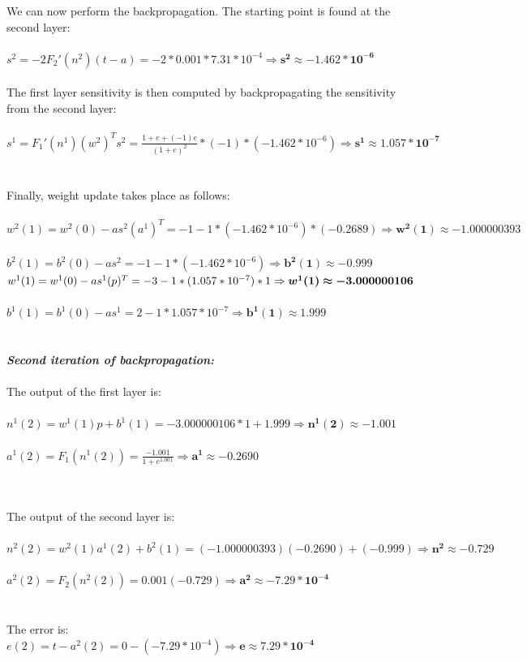\documentclass{article}
\begin{document}
\noindent We can now perform the backpropagation. The starting point is found at the second layer: \\ \\
$s^2 = -2F_2'(n^2)(t-a) = -2 * 0.001 * 7.31 * 10^{-4} \Rightarrow \bm{s^2 \approx -1.462 * 10^{-6}}$
\\\\ The first layer sensitivity is then computed by backpropagating the sensitivity from the second layer: \\ \\ $s^1 = F_1'(n^1)(w^2)^Ts^2 = \frac{1+e+(-1)e}{(1+e)^2} * (-1) *(-1.462 * 10^{-6}) \Rightarrow \bm{s^1 \approx 1.057 * 10^{-7}}$
\\\\ \\Finally, weight update takes place as follows: \\\\
$w^2(1) = w^2(0) - as^2(a^1)^T = -1 -1 * (-1.462 * 10 ^{-6}) * (-0.2689) \Rightarrow \bm{w^2(1) \approx -1.000000393}$
\\ \\ $b^2(1) = b^2(0) -as^2 = -1 -1 * (-1.462 * 10 ^ {-6}) \Rightarrow \bm{b^2(1) \approx -0.999}$
$\\ \\ \\ w^1(1) = w^1(0) -as^1(p)^T = -3 -1 * (1.057 * 10^{-7}) * 1 \Rightarrow \bm{w^1(1) \approx -3.000000106} $ 
\\ \\$b^1(1) = b^1(0) - as^1 = 2 - 1 * 1.057 * 10^{-7} \Rightarrow \bm{b^1(1) \approx 1.999}$\\ \\ \\

\noindent \textbf{\textit{Second iteration of backpropagation:}}
\noindent \\ \\The output of the first layer is: \\ \\$n^1(2) = w^1(1)p + b^1(1) = -3.000000106 * 1 + 1.999\Rightarrow \bm{n^1(2) \approx -1.001}$
\\ \\$a^1(2) = F_1(n^1(2)) = \frac{-1.001}{1+e^{1.001}} \Rightarrow \bm{a^1 \approx -0.2690}$

\noindent \\ \\The output of the second layer is: \\ \\$n^2(2) = w^2(1)a^1(2) + b^2(1) = (-1.000000393)(-0.2690) + (-0.999) \Rightarrow \bm{n^2 \approx -0.729}$
\\ \\$a^2(2) = F_2(n^2(2)) = 0.001(-0.729) \Rightarrow \bm{a^2 \approx -7.29 * 10^{-4}}$
\\ \\ \\The error is: \\$e(2) = t - a^2(2) = 0 - (-7.29 * 10^{-4}) \Rightarrow \bm{e \approx 7.29 * 10^{-4}}$ \\\\
\end{document}
